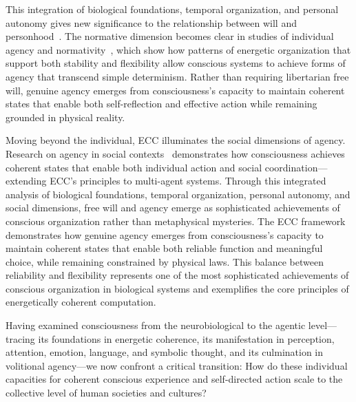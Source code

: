 This integration of biological foundations, temporal organization, and personal autonomy gives new significance to the relationship between will and personhood~\cite{Frankfurt1971, bosl2025dynamical}. The normative dimension becomes clear in studies of individual agency and normativity~\cite{Taylor1985, zheng2025unbearable}, which show how patterns of energetic organization that support both stability and flexibility allow conscious systems to achieve forms of agency that transcend simple determinism. Rather than requiring libertarian free will, genuine agency emerges from consciousness's capacity to maintain coherent states that enable both self-reflection and effective action while remaining grounded in physical reality.

Moving beyond the individual, ECC illuminates the social dimensions of agency. Research on agency in social contexts~\cite{Bandura2001, da2024mathematical} demonstrates how consciousness achieves coherent states that enable both individual action and social coordination—extending ECC's principles to multi-agent systems. Through this integrated analysis of biological foundations, temporal organization, personal autonomy, and social dimensions, free will and agency emerge as sophisticated achievements of conscious organization rather than metaphysical mysteries. The ECC framework demonstrates how genuine agency emerges from consciousness's capacity to maintain coherent states that enable both reliable function and meaningful choice, while remaining constrained by physical laws. This balance between reliability and flexibility represents one of the most sophisticated achievements of conscious organization in biological systems and exemplifies the core principles of energetically coherent computation.

Having examined consciousness from the neurobiological to the agentic level—tracing its foundations in energetic coherence, its manifestation in perception, attention, emotion, language, and symbolic thought, and its culmination in volitional agency—we now confront a critical transition: How do these individual capacities for coherent conscious experience and self-directed action scale to the collective level of human societies and cultures? 

